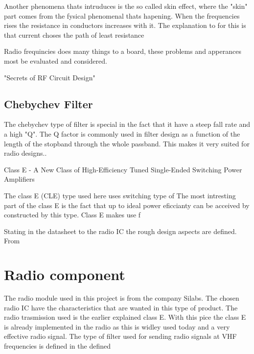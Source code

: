 Another phenomena thats intruduces is the so called skin effect, where the "skin" part comes from the fysical phenomenal thats hapening. When the frequencies rises the resistance in conductors increases with it. The explanation to for this is that current choses the path of least resistance


Radio frequincies does many things to a board, these problems and apperances most be evaluated and considered.  



"Secrets of RF Circuit Design"
 
\subsection{Chebychev Filter}
The chebychev type of filter is special in the fact that it have a steep fall rate and a high "Q". The Q factor is commonly used in filter design as a function of the length of the stopband through the whole passband.
This makes it very suited for radio designs.. 


\cite{class_e_new}
Class E - A New Class of High-Efficiency Tuned Single-Ended Switching Power Amplifiers

The class E (CLE) type used here uses switching type of 
The most intresting part of the class E is the fact that up to ideal power eficcianty can be acceived by constructed by this type. Class E makes use f

Stating in the datasheet to the radio IC the rough design aspects are defined. From

\section{Radio component}
 The radio module used in this project is from the company Silabs. The chosen radio IC have the characteristics that are wanted in this type of product. The radio trasmission used is the earlier explained class E. With this pice the class E is already implemented in the radio as this is widley used today and a very effective radio signal. 
The type of filter used for sending radio signals at VHF frequencies is defined in the defined 

